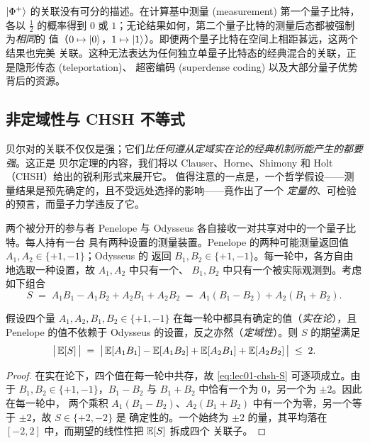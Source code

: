 \begin{remark}[纠缠的物理意义]
$\ket{\Phi^{+}}$ 的关联没有可分的描述。在计算基中测量 (measurement) 第一个量子比特，各以
$\tfrac12$ 的概率得到 $0$ 或 $1$；无论结果如何，第二个量子比特的测量后态都被强制为\emph{相同}的
值（$0\mapsto\ket{0}$，$1\mapsto\ket{1}$）。即便两个量子比特在空间上相距甚远，这两个结果也完美
关联。这种无法表达为任何独立单量子比特态的经典混合的关联，正是隐形传态 (teleportation)、
超密编码 (superdense coding) 以及大部分量子优势背后的资源。
\end{remark}

\subsection{非定域性与 CHSH 不等式}
\label{sec:lec01-chsh}

贝尔对的关联不仅仅是强；它们\emph{比任何遵从定域实在论的经典机制所能产生的都要强}。这正是
贝尔定理的内容，我们将以 Clauser、Horne、Shimony 和 Holt（CHSH）给出的锐利形式来展开它。
值得注意的一点是，一个哲学假设——测量结果是预先确定的，且不受远处选择的影响——竟作出了一个
\emph{定量的}、可检验的预言，而量子力学违反了它。

两个被分开的参与者 Penelope 与 Odysseus 各自接收一对共享对中的一个量子比特。每人持有一台
具有两种设置的测量装置。Penelope 的两种可能测量返回值 $A_1,A_2\in\{+1,-1\}$；Odysseus 的
返回 $B_1,B_2\in\{+1,-1\}$。每一轮中，各方自由地选取一种设置，故 $A_1,A_2$ 中只有一个、
$B_1,B_2$ 中只有一个被实际观测到。考虑如下组合
\begin{equation}\label{eq:lec01-chsh-S}
  S \;=\; A_1B_1-A_1B_2+A_2B_1+A_2B_2 \;=\; A_1(B_1-B_2)+A_2(B_1+B_2).
\end{equation}

\begin{theorem}\label{thm:lec01-chsh}
假设四个量 $A_1,A_2,B_1,B_2\in\{+1,-1\}$ 在每一轮中都具有确定的值（\emph{实在论}），且
Penelope 的值不依赖于 Odysseus 的设置，反之亦然（\emph{定域性}）。则 $S$ 的期望满足
\[
  \bigl|\,\mathbb{E}[S]\,\bigr|\;=\;\bigl|\,\mathbb{E}[A_1B_1]-\mathbb{E}[A_1B_2]+\mathbb{E}[A_2B_1]+\mathbb{E}[A_2B_2]\,\bigr|\;\le\;2.
\]
\end{theorem}

\begin{proof}
在实在论下，四个值在每一轮中共存，故 \eqref{eq:lec01-chsh-S} 可逐项成立。由于
$B_1,B_2\in\{+1,-1\}$，$B_1-B_2$ 与 $B_1+B_2$ 中恰有一个为 $0$，另一个为 $\pm2$。因此在每一轮中，
两个乘积 $A_1(B_1-B_2)$、$A_2(B_1+B_2)$ 中有一个为零，另一个等于 $\pm2$，故 $S\in\{+2,-2\}$ 是
确定性的。一个始终为 $\pm2$ 的量，其平均落在 $[-2,2]$ 中，而期望的线性性把 $\mathbb{E}[S]$ 拆成四个
关联子。
\end{proof}

